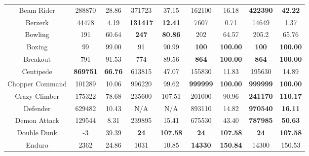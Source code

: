 \documentclass[nohyperref]{article}
\newcommand{\best}[1]{\textbf{#1}}
\theoremstyle{plain}
\begin{document}
\begin{table}[!hb]
\begin{center}
\begin{tabular}{| c | c c |  c c| c c| c c|}
 Beam Rider      &288870          &28.86               &371723       &37.15                 & 162100            &16.18       &\textbf{422390}            &\textbf{42.22}      \\
 Berzerk         &44478           &4.19                &\textbf{131417}       &\textbf{12.41 }                & 7607              &0.71        &14649             &1.37      \\
 Bowling         &191             &60.64               &\textbf{247}           &\textbf{80.86 }                & 202               &64.57      &205.2             &65.76       \\
 Boxing          &99              &99.00               &91                     &90.99                          & \best{100}        &\best{100.00} &\textbf{100}       &\textbf{100.00}           \\
 Breakout        &791             &91.53               &774                    &89.56                          & \best{864}        &\best{100.00} &\textbf{864}     &\textbf{100.00}          \\
 Centipede       &\textbf{869751} &\textbf{66.76}      &613815                &47.07                          & 155830            &11.83        &195630    &14.89  \\
 Chopper Command &101289       &10.06               &996220                &99.62                          & \best{999999}     &\best{100.00}   &\textbf{999999}    &\textbf{100.00}       \\
 Crazy Climber   &175322       &78.68               &235600       &107.51                & 201000            &90.96           &\textbf{241170}    &\textbf{110.17} \\
 Defender        &629482       &10.43               &N/A                    &N/A                            & 893110     &14.82   &\textbf{970540}    &\textbf{16.11}        \\
 Demon Attack    &129544       &8.31                &239895                 &15.41                          & 675530     &43.40   &\textbf{787985}   &\textbf{50.63}       \\
 Double Dunk     &-3           &39.39               &\textbf{24}            &\textbf{107.58}                         & \best{24}         &\best{107.58}  &\textbf{24}        &\textbf{107.58}         \\
 Enduro          &2362         &24.86               &1031                   &10.85                          & \best{14330}      &\best{150.84}  &14300     &150.53         \\

\end{tabular}
\end{center}
\end{table}
\end{document}
